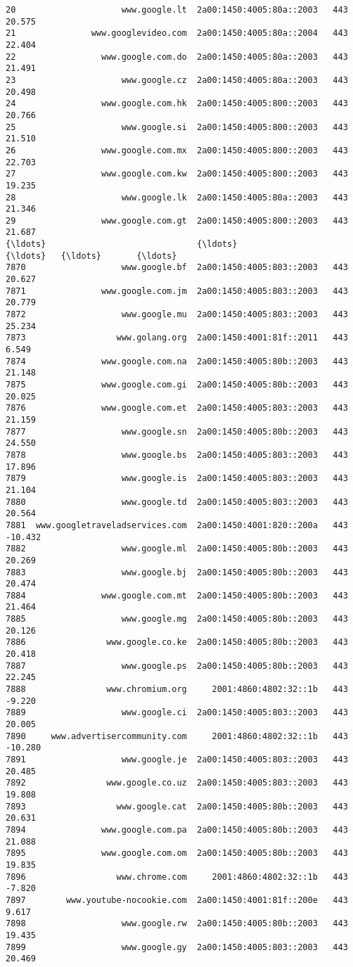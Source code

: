 \documentclass[11pt]{article}
\begin{document}
\begin{Verbatim}[commandchars=\\\{\}]
20                     www.google.lt  2a00:1450:4005:80a::2003   443    20.575
21               www.googlevideo.com  2a00:1450:4005:80a::2004   443    22.404
22                 www.google.com.do  2a00:1450:4005:80a::2003   443    21.491
23                     www.google.cz  2a00:1450:4005:80a::2003   443    20.498
24                 www.google.com.hk  2a00:1450:4005:800::2003   443    20.766
25                     www.google.si  2a00:1450:4005:800::2003   443    21.510
26                 www.google.com.mx  2a00:1450:4005:800::2003   443    22.703
27                 www.google.com.kw  2a00:1450:4005:800::2003   443    19.235
28                     www.google.lk  2a00:1450:4005:80a::2003   443    21.346
29                 www.google.com.gt  2a00:1450:4005:800::2003   443    21.687
{\ldots}                              {\ldots}                       {\ldots}   {\ldots}       {\ldots}
7870                   www.google.bf  2a00:1450:4005:803::2003   443    20.627
7871               www.google.com.jm  2a00:1450:4005:803::2003   443    20.779
7872                   www.google.mu  2a00:1450:4005:803::2003   443    25.234
7873                  www.golang.org  2a00:1450:4001:81f::2011   443     6.549
7874               www.google.com.na  2a00:1450:4005:80b::2003   443    21.148
7875               www.google.com.gi  2a00:1450:4005:80b::2003   443    20.025
7876               www.google.com.et  2a00:1450:4005:803::2003   443    21.159
7877                   www.google.sn  2a00:1450:4005:80b::2003   443    24.550
7878                   www.google.bs  2a00:1450:4005:803::2003   443    17.896
7879                   www.google.is  2a00:1450:4005:803::2003   443    21.104
7880                   www.google.td  2a00:1450:4005:803::2003   443    20.564
7881  www.googletraveladservices.com  2a00:1450:4001:820::200a   443   -10.432
7882                   www.google.ml  2a00:1450:4005:80b::2003   443    20.269
7883                   www.google.bj  2a00:1450:4005:80b::2003   443    20.474
7884               www.google.com.mt  2a00:1450:4005:80b::2003   443    21.464
7885                   www.google.mg  2a00:1450:4005:80b::2003   443    20.126
7886                www.google.co.ke  2a00:1450:4005:80b::2003   443    20.418
7887                   www.google.ps  2a00:1450:4005:80b::2003   443    22.245
7888                www.chromium.org     2001:4860:4802:32::1b   443    -9.220
7889                   www.google.ci  2a00:1450:4005:803::2003   443    20.005
7890     www.advertisercommunity.com     2001:4860:4802:32::1b   443   -10.280
7891                   www.google.je  2a00:1450:4005:803::2003   443    20.485
7892                www.google.co.uz  2a00:1450:4005:803::2003   443    19.808
7893                  www.google.cat  2a00:1450:4005:80b::2003   443    20.631
7894               www.google.com.pa  2a00:1450:4005:80b::2003   443    21.088
7895               www.google.com.om  2a00:1450:4005:80b::2003   443    19.835
7896                  www.chrome.com     2001:4860:4802:32::1b   443    -7.820
7897        www.youtube-nocookie.com  2a00:1450:4001:81f::200e   443     9.617
7898                   www.google.rw  2a00:1450:4005:80b::2003   443    19.435
7899                   www.google.gy  2a00:1450:4005:803::2003   443    20.469


\end{Verbatim}
\end{document}
